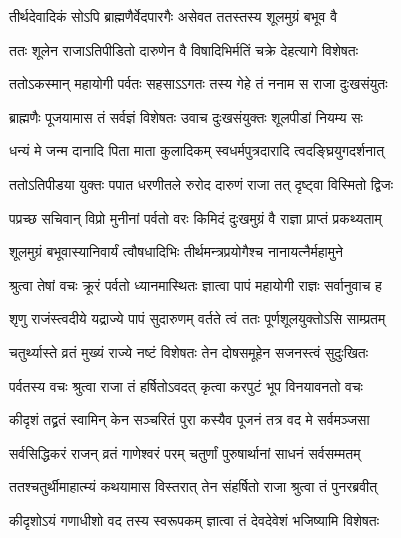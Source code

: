 \twolineshloka
{तीर्थदेवादिकं सोऽपि ब्राह्मणैर्वेदपारगैः}
{असेवत ततस्तस्य शूलमुग्रं बभूव वै} %

\twolineshloka
{ततः शूलेन राजाऽतिपीडितो दारुणेन वै}
{विषादिभिर्मतिं चक्रे देहत्यागे विशेषतः} %

\twolineshloka
{ततोऽकस्मान् महायोगी पर्वतः सहसाऽऽगतः}
{तस्य गेहे तं ननाम स राजा दुःखसंयुतः} %

\twolineshloka
{ब्राह्मणैः पूजयामास तं सर्वज्ञं विशेषतः}
{उवाच दुःखसंयुक्तः शूलपीडां नियम्य सः} %


\twolineshloka
{धन्यं मे जन्म दानादि पिता माता कुलादिकम्}
{स्वधर्मपुत्रदारादि त्वदङ्घ्रियुगदर्शनात्} %

\twolineshloka
{ततोऽतिपीडया युक्तः पपात धरणीतले}
{रुरोद दारुणं राजा तत् दृष्ट्वा विस्मितो द्विजः} %

\twolineshloka
{पप्रच्छ सचिवान् विप्रो मुनीनां पर्वतो वरः}
{किमिदं दुःखमुग्रं वै राज्ञा प्राप्तं प्रकथ्यताम्} %


\twolineshloka
{शूलमुग्रं बभूवास्यानिवार्यं त्वौषधादिभिः}
{तीर्थमन्त्रप्रयोगैश्च नानायत्नैर्महामुने} %

\twolineshloka
{श्रुत्वा तेषां वचः क्रूरं पर्वतो ध्यानमास्थितः}
{ज्ञात्वा पापं महायोगी राज्ञः सर्वानुवाच ह} %


\twolineshloka
{श‍ृणु राजंस्त्वदीये यद्राज्ये पापं सुदारुणम्}
{वर्तते त्वं ततः पूर्णशूलयुक्तोऽसि साम्प्रतम्} %

\twolineshloka
{चतुर्थ्यास्ते व्रतं मुख्यं राज्ये नष्टं विशेषतः}
{तेन दोषसमूहेन सजनस्त्वं सुदुःखितः} %

\twolineshloka
{पर्वतस्य वचः श्रुत्वा राजा तं हर्षितोऽवदत्}
{कृत्वा करपुटं भूप विनयावनतो वचः} %


\twolineshloka
{कीदृशं तद्व्रतं स्वामिन् केन सञ्चरितं पुरा}
{कस्यैव पूजनं तत्र वद मे सर्वमञ्जसा} %


\twolineshloka
{सर्वसिद्धिकरं राजन् व्रतं गाणेश्वरं परम्}
{चतुर्णां पुरुषार्थानां साधनं सर्वसम्मतम्} %

\twolineshloka
{ततश्चतुर्थीमाहात्म्यं कथयामास विस्तरात्}
{तेन संहर्षितो राजा श्रुत्वा तं पुनरब्रवीत्} %

\twolineshloka
{कीदृशोऽयं गणाधीशो वद तस्य स्वरूपकम्}
{ज्ञात्वा तं देवदेवेशं भजिष्यामि विशेषतः} %

